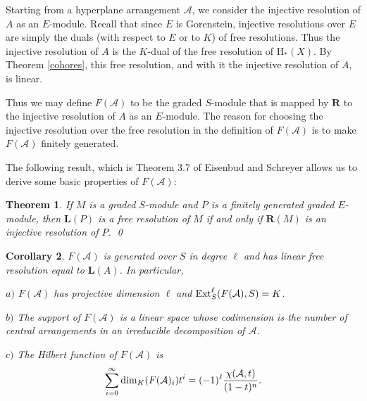 \documentclass{tran-l}
\newtheorem{theorem}{Theorem}[section]
\newtheorem{corollary}[theorem]{Corollary}
\theoremstyle{definition}
\theoremstyle{remark}
\newcommand{\Acal}{{{\mathcal A}}}
\newcommand{\LL}{{\mathbf{L}}}
\newcommand{\RR}{{\mathbf{R}}}
\newcommand{\Ext}{\mathop{\rm Ext}\nolimits}
\newcommand{\rH}{{\mathrm H}}
\begin{document}
Starting from a hyperplane arrangement $\Acal$, we
consider the injective resolution of $A$ as an $E$-module.
Recall that since $E$ is
Gorenstein, injective resolutions over $E$ are simply
the duals (with respect to $E$ or to $ K$) 
of free resolutions. Thus the
injective resolution of $A$ is the $ K$-dual of the free resolution of
$\rH_*(X)$. By Theorem \ref{cohores}, this free resolution, and with it the 
injective resolution of $A$, is linear. 

Thus we may define
$F(\Acal)$  to be the graded $S$-module that is mapped by
$\RR$ to the injective resolution of $A$ as an $E$-module.
The reason for choosing the injective
resolution over the free resolution in the definition of $F(\Acal)$
is to make
$F(\Acal)$ finitely generated. 

The following result, which is Theorem 3.7 of Eisenbud and Schreyer
\cite{ES} 
allows us to derive some basic properties of $F(\Acal)$:

\begin{theorem}\label{reciprocity}
If $M$ is a
graded $S$-module and $P$ is a finitely generated graded
$E$-module, then $\LL(P)$ is a free resolution of $M$ 
if and only if $\RR(M)$ is an injective resolution of $P$. 
\qed
\end{theorem}

\begin{corollary}\label{Fproperties} 
$F(\Acal)$ is generated over $S$ in degree $\ell$ and
has linear free resolution equal to $\LL(A)$. In particular,

{$a)$}
$F(\Acal)$ has projective dimension $\ell$ and $\Ext^\ell_S(F(\Acal), S)= K$.

{$b)$}
 The support of $F(\Acal)$ is a linear space whose codimension is the 
number of central arrangements in an irreducible decomposition of $\Acal$.

{$c)$}
The Hilbert function of $F(\Acal)$ is 
\[
\sum_{i=0}^{\infty}\dim_K(F(\Acal)_i)t^i=
(-1)^{\ell}{{\chi(\Acal,t)}\over{(1-t)^n}}.
\]\end{corollary}
\end{document}
